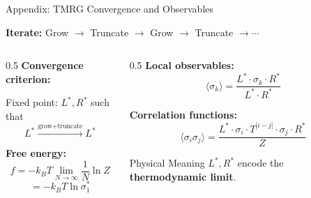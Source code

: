 \documentclass[aspectratio=169, 11pt]{beamer}
\begin{document}
\begin{frame}{Appendix: TMRG Convergence and Observables}
    
    \textbf{Iterate:} Grow $\to$ Truncate $\to$ Grow $\to$ Truncate $\to \cdots$
    
    \vspace{0.3cm}
    
    \begin{columns}
        \begin{column}{0.5\textwidth}
            \textbf{Convergence criterion:}
            
            Fixed point: $L^*, R^*$ such that
            \[
            L^* \xrightarrow{\text{grow+truncate}} L^*
            \]
            
            \vspace{0.3cm}
            
            \textbf{Free energy:}
            \[
            f = -k_B T \lim_{N\to\infty} \frac{1}{N} \ln Z
            \]
            \[
            = -k_B T \ln \sigma_1^*
            \]
        \end{column}
        
        \begin{column}{0.5\textwidth}
            \textbf{Local observables:}
            \[
            \langle \sigma_k \rangle = \frac{L^* \cdot \sigma_k \cdot R^*}{L^* \cdot R^*}
            \]
            
            \textbf{Correlation functions:}
            \[
            \langle \sigma_i \sigma_j \rangle = \frac{L^* \cdot \sigma_i \cdot T^{|i-j|} \cdot \sigma_j \cdot R^*}{Z}
            \]
            
            \vspace{0.3cm}
            
            \begin{block}{Physical Meaning}
                $L^*, R^*$ encode the \textbf{thermodynamic limit}.
            \end{block}
        \end{column}
    \end{columns}
\end{frame}

\end{document}
